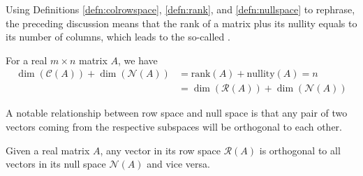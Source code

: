 Using Definitions \ref{defn:colrowspace}, \ref{defn:rank}, and \ref{defn:nullspace} to rephrase, the preceding discussion means that the rank of a matrix plus its nullity equals to its number of columns, which leads to the so-called .
\begin{thm}
\label{thm:ranknullity}
For a real $m \times n$ matrix $A$, we have
\begin{align*}
\dim(\mathcal{C}(A)) + \dim(\mathcal{N}(A)) &= \text{rank}(A) + \text{nullity}(A) = n \\
&= \dim(\mathcal{R}(A)) + \dim(\mathcal{N}(A))
\end{align*}
\end{thm}

A notable relationship between row space and null space is that any pair of two vectors coming from the respective subspaces will be orthogonal to each other. 
\begin{proper}
\label{proper:rownullortho}
Given a real matrix $A$, any vector in its row space $\mathcal{R}(A)$ is orthogonal to all vectors in its null space $\mathcal{N}(A)$ and vice versa.
\end{proper}
